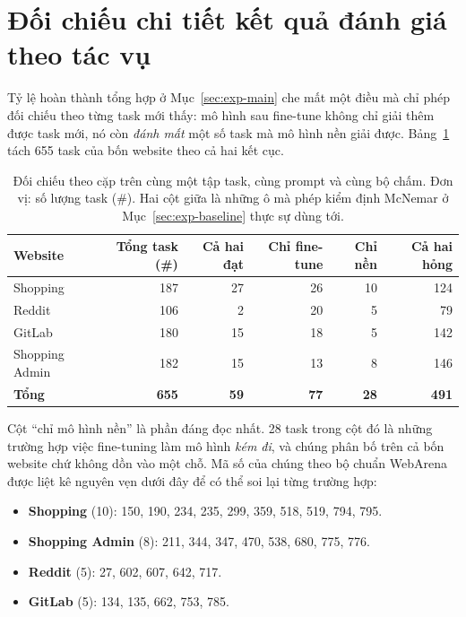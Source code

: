 \section{Đối chiếu chi tiết kết quả đánh giá theo tác vụ}
\label{app:runs-eval}

Tỷ lệ hoàn thành tổng hợp ở Mục~\ref{sec:exp-main} che mất một điều mà chỉ
phép đối chiếu theo từng task mới thấy: mô hình sau fine-tune không chỉ
giải thêm được task mới, nó còn \emph{đánh mất} một số task mà mô hình
nền giải được. Bảng~\ref{tab:app-mcnemar} tách 655 task của bốn website
theo cả hai kết cục.

\begin{table}[H]
\centering
\caption[Đối chiếu theo cặp giữa mô hình nền và mô hình sau fine-tune]{Đối
chiếu theo cặp trên cùng một tập task, cùng prompt và cùng bộ chấm. Đơn vị: số lượng task (\#). Hai
cột giữa là những ô mà phép kiểm định McNemar ở Mục~\ref{sec:exp-baseline}
thực sự dùng tới.}
\label{tab:app-mcnemar}
\small
\begin{tabular}{@{}lrrrrr@{}}
\toprule
\textbf{Website} & \textbf{Tổng task (\#)} & \textbf{Cả hai đạt} &
\textbf{Chỉ fine-tune} & \textbf{Chỉ nền} & \textbf{Cả hai hỏng} \\
\midrule
Shopping       & 187 & 27 & 26 & 10 & 124 \\
Reddit         & 106 &  2 & 20 &  5 &  79 \\
GitLab         & 180 & 15 & 18 &  5 & 142 \\
Shopping Admin & 182 & 15 & 13 &  8 & 146 \\
\midrule
\textbf{Tổng} & \textbf{655} & \textbf{59} & \textbf{77} & \textbf{28} &
\textbf{491} \\
\bottomrule
\end{tabular}
\end{table}

\noindent
Cột ``chỉ mô hình nền'' là phần đáng đọc nhất. 28 task trong cột đó là
những trường hợp việc fine-tuning làm mô hình \emph{kém đi}, và chúng phân bố
trên cả bốn website chứ không dồn vào một chỗ. Mã số của chúng theo bộ chuẩn
WebArena được liệt kê nguyên vẹn dưới đây để có thể soi lại từng trường hợp:

\begin{itemize}
  \item \textbf{Shopping} (10): 150, 190, 234, 235, 299, 359, 518, 519, 794,
  795.
  \item \textbf{Shopping Admin} (8): 211, 344, 347, 470, 538, 680, 775, 776.
  \item \textbf{Reddit} (5): 27, 602, 607, 642, 717.
  \item \textbf{GitLab} (5): 134, 135, 662, 753, 785.
\end{itemize}


